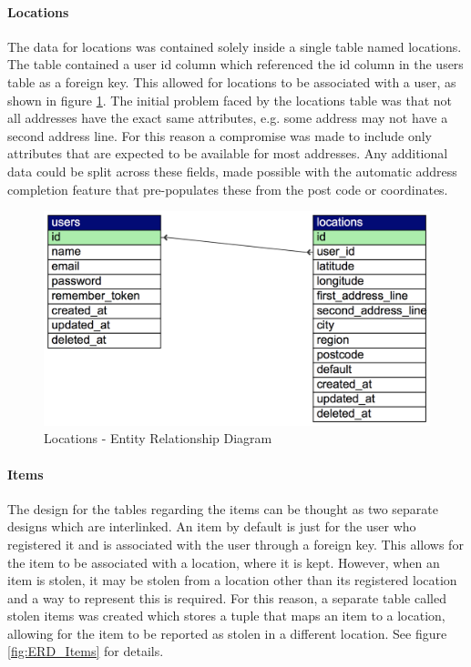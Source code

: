 \paragraph{Locations} The data for locations was contained solely inside a single table named locations. The table contained a user id column which referenced the id column in the users table as a foreign key. This allowed for locations to be associated with a user, as shown in figure \ref{fig:ERD_Locations}. The initial problem faced by the locations table was that not all addresses have the exact same attributes, e.g. some address may not have a second address line. For this reason a compromise was made to include only attributes that are expected to be available for most addresses. Any additional data could be split across these fields, made possible with the automatic address completion feature that pre-populates these from the post code or coordinates.

\begin{figure}[H]
	\centering
	\includegraphics[width=1.0\textwidth]{images/Database/ERD_Locations}
	\caption{Locations - Entity Relationship Diagram} \label{fig:ERD_Locations}
\end{figure}

\paragraph{Items} The design for the tables regarding the items can be thought as two separate designs which are interlinked. An item by default is just for the user who registered it and is associated with the user through a foreign key. This allows for the item to be associated with a location, where it is kept. However, when an item is stolen, it may be stolen from a location other than its registered location and a way to represent this is required. For this reason, a separate table called stolen items was created which stores a tuple that maps an item to a location, allowing for the item to be reported as stolen in a different location. See figure \ref{fig:ERD_Items} for details. 

